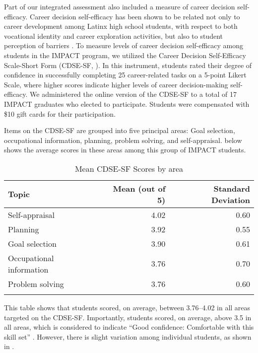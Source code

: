 \documentclass[output=paper]{langscibook}
\begin{document}
Part of our integrated assessment also included a measure of career decision self-efficacy. Career decision self-efficacy has been shown to be related not only to career development among Latinx high school students, with respect to both vocational identity and career exploration activities, but also to student perception of barriers \citep{GushueScalan2006}. To measure levels of career decision self-efficacy among students in the IMPACT program, we utilized the Career Decision Self-Efficacy Scale-Short Form (CDSE-SF, \citealt{BetzTaylor2012}). In this instrument, students rated their degree of confidence in successfully completing 25 career-related tasks on a 5-point Likert Scale, where higher scores indicate higher levels of career decision-making self-efficacy. We administered the online version of the CDSE-SF to a total of 17 IMPACT graduates who elected to participate. Students were compensated with \$10 gift cards for their participation.

Items on the CDSE-SF are grouped into five principal areas: Goal selection, occupational information, planning, problem solving, and self-appraisal.  below shows the average scores in these areas among this group of IMPACT students.

\begin{table}
\caption{\label{tab:5:2}Mean CDSE-SF Scores by area}
\begin{tabularx}{\textwidth}{Xrr}
\lsptoprule
 Topic & Mean (out of 5) & Standard Deviation \\
 \midrule
Self-appraisal & 4.02 & 0.60\\
Planning & 3.92 & 0.55\\
Goal selection & 3.90 & 0.61\\
Occupational information & 3.76 & 0.70\\
Problem solving & 3.76 & 0.60\\
\lspbottomrule
\end{tabularx}
\end{table}


This table shows that students scored, on average, between 3.76--4.02 in all areas targeted on the CDSE-SF.  Importantly, students scored, on average, above 3.5 in all areas, which is considered to indicate “Good confidence: Comfortable with this skill set” \citep{BetzTaylor2012}. However, there is slight variation among individual students, as shown in .
\end{document}

